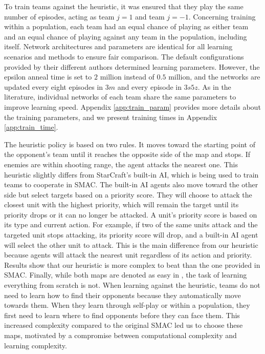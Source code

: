 To train teams against the heuristic, it was ensured that they play the same number of episodes, acting as team $j=1$ and team $j=-1$.
Concerning training within a population, each team had an equal chance of playing as either team and an equal chance of playing against any team in the population, including itself.
Network architectures and parameters are identical for all learning scenarios and methods to ensure fair comparison.
The default configurations provided by their different authors \citep{Rashid2018,Mahajan2019MAVEN:Exploration,leroy2020qvmix} determined learning parameters.
However, the epsilon anneal time is set to $2$ million instead of $0.5$ million, and the networks are updated every eight episodes in $3m$ and every episode in $3s5z$.
As in the literature, individual networks of each team share the same parameters to improve learning speed. 
Appendix \ref{app:train_param} provides more details about the training parameters, and we present training times in Appendix \ref{app:train_time}.

The heuristic policy is based on two rules.
It moves toward the starting point of the opponent's team until it reaches the opposite side of the map and stops.
If enemies are within shooting range, the agent attacks the nearest one.
This heuristic slightly differs from StarCraft's built-in AI, which is being used to train teams to cooperate in SMAC.
The built-in AI agents also move toward the other side but select targets based on a priority score.
They will choose to attack the closest unit with the highest priority, which will remain the target until its priority drops or it can no longer be attacked.
A unit's priority score is based on its type and current action.
For example, if two of the same units attack and the targeted unit stops attacking, its priority score will drop, and a built-in AI agent will select the other unit to attack.
This is the main difference from our heuristic because agents will attack the nearest unit regardless of its action and priority.
Results show that our heuristic is more complex to beat than the one provided in SMAC.
Finally, while both maps are denoted as easy in \citep{samvelyan2019starcraft}, the task of learning everything from scratch is not.
When learning against the heuristic, teams do not need to learn how to find their opponents because they automatically move towards them.
When they learn through self-play or within a population, they first need to learn where to find opponents before they can face them.
This increased complexity compared to the original SMAC led us to choose these maps, motivated by a compromise between computational complexity and learning complexity.

